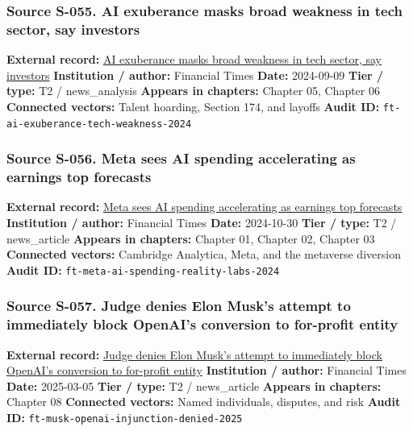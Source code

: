 \documentclass[
  american,
  11pt,
  letterpaper,
]{article}
\begin{document}
\subsubsection{Source S-055. AI exuberance masks broad weakness in tech
sector, say
investors}\label{source-s-055-ai-exuberance-masks-broad-weakness-in-tech-sector-say-investors}

\textbf{External record:}
\href{https://www.ft.com/content/0b14d871-2d19-46f1-9660-5466301e8066}{AI
exuberance masks broad weakness in tech sector, say investors}
\textbf{Institution / author:} Financial Times \textbf{Date:} 2024-09-09
\textbf{Tier / type:} T2 / news\_analysis \textbf{Appears in chapters:}
Chapter 05, Chapter 06 \textbf{Connected vectors:} Talent hoarding,
Section 174, and layoffs \textbf{Audit ID:}
\texttt{ft-ai-exuberance-tech-weakness-2024}

\subsubsection{Source S-056. Meta sees AI spending accelerating as
earnings top
forecasts}\label{source-s-056-meta-sees-ai-spending-accelerating-as-earnings-top-forecasts}

\textbf{External record:}
\href{https://www.ft.com/content/8ae0eea7-a4bd-4f5c-b448-c44899dfa243}{Meta
sees AI spending accelerating as earnings top forecasts}
\textbf{Institution / author:} Financial Times \textbf{Date:} 2024-10-30
\textbf{Tier / type:} T2 / news\_article \textbf{Appears in chapters:}
Chapter 01, Chapter 02, Chapter 03 \textbf{Connected vectors:} Cambridge
Analytica, Meta, and the metaverse diversion \textbf{Audit ID:}
\texttt{ft-meta-ai-spending-reality-labs-2024}

\subsubsection{Source S-057. Judge denies Elon Musk's attempt to
immediately block OpenAI's conversion to for-profit
entity}\label{source-s-057-judge-denies-elon-musks-attempt-to-immediately-block-openais-conversion-to-for-profit-entity}

\textbf{External record:}
\href{https://www.ft.com/content/532931dd-e1c0-4f18-a8af-5777dd70a52d}{Judge
denies Elon Musk's attempt to immediately block OpenAI's conversion to
for-profit entity} \textbf{Institution / author:} Financial Times
\textbf{Date:} 2025-03-05 \textbf{Tier / type:} T2 / news\_article
\textbf{Appears in chapters:} Chapter 08 \textbf{Connected vectors:}
Named individuals, disputes, and risk \textbf{Audit ID:}
\texttt{ft-musk-openai-injunction-denied-2025}
\end{document}
